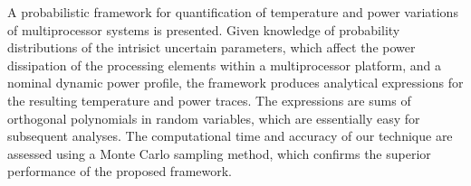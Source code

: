A probabilistic framework for quantification of temperature and power variations of multiprocessor systems is presented. Given knowledge of probability distributions of the intrisict uncertain parameters, which affect the power dissipation of the processing elements within a multiprocessor platform, and a nominal dynamic power profile, the framework produces analytical expressions for the resulting temperature and power traces. The expressions are sums of orthogonal polynomials in random variables, which are essentially easy for subsequent analyses. The computational time and accuracy of our technique are assessed using a Monte Carlo sampling method, which confirms the superior performance of the proposed framework.
